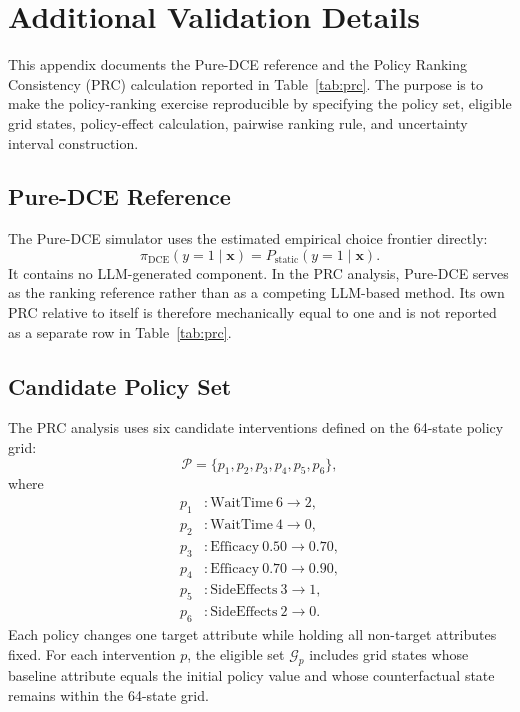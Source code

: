\documentclass[11pt]{article}
\begin{document}
\section{Additional Validation Details}
\label{app:pure_dce_prc}

This appendix documents the Pure-DCE reference and the Policy Ranking Consistency (PRC) calculation reported in Table~\ref{tab:prc}. The purpose is to make the policy-ranking exercise reproducible by specifying the policy set, eligible grid states, policy-effect calculation, pairwise ranking rule, and uncertainty interval construction.

\subsection{Pure-DCE Reference}

The Pure-DCE simulator uses the estimated empirical choice frontier directly:
\[
\pi_{\mathrm{DCE}}(y=1\mid \mathbf{x})
=
P_{\mathrm{static}}(y=1\mid \mathbf{x}).
\]
It contains no LLM-generated component. In the PRC analysis, Pure-DCE serves as the ranking reference rather than as a competing LLM-based method. Its own PRC relative to itself is therefore mechanically equal to one and is not reported as a separate row in Table~\ref{tab:prc}.

\subsection{Candidate Policy Set}

The PRC analysis uses six candidate interventions defined on the 64-state policy grid:
\[
\mathcal{P}
=
\{p_1,p_2,p_3,p_4,p_5,p_6\},
\]
where
\[
\begin{aligned}
p_1 &: \mathrm{WaitTime}\ 6 \rightarrow 2,\\
p_2 &: \mathrm{WaitTime}\ 4 \rightarrow 0,\\
p_3 &: \mathrm{Efficacy}\ 0.50 \rightarrow 0.70,\\
p_4 &: \mathrm{Efficacy}\ 0.70 \rightarrow 0.90,\\
p_5 &: \mathrm{SideEffects}\ 3 \rightarrow 1,\\
p_6 &: \mathrm{SideEffects}\ 2 \rightarrow 0.
\end{aligned}
\]
Each policy changes one target attribute while holding all non-target attributes fixed. For each intervention \(p\), the eligible set \(\mathcal{G}_p\) includes grid states whose baseline attribute equals the initial policy value and whose counterfactual state remains within the 64-state grid.
\end{document}
